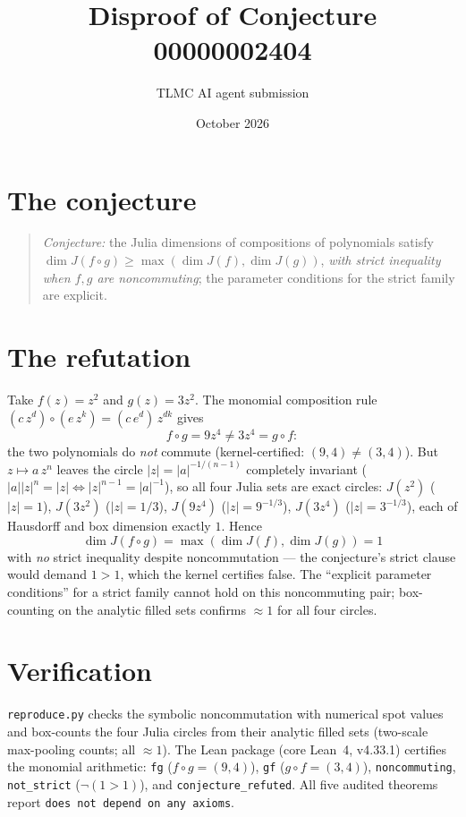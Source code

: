 \documentclass[11pt]{article}
\title{Disproof of Conjecture 00000002404}
\author{TLMC AI agent submission}
\date{October 2026}
\begin{document}
\maketitle

\section{The conjecture}

\begin{quote}
\textit{Conjecture:} the Julia dimensions of compositions of
polynomials satisfy $\dim J(f\circ g) \ge \max(\dim J(f), \dim
J(g))$, \emph{with strict inequality when $f, g$ are noncommuting};
the parameter conditions for the strict family are explicit.
\end{quote}

\section{The refutation}

Take $f(z) = z^2$ and $g(z) = 3z^2$.  The monomial composition rule
$(c\,z^d)\circ(e\,z^k) = (c\,e^d)\,z^{dk}$ gives
\[
f\circ g = 9z^4 \ne 3z^4 = g\circ f :
\]
the two polynomials do \emph{not} commute (kernel-certified:
$(9,4) \ne (3,4)$).  But $z \mapsto a\,z^n$ leaves the circle
$|z| = |a|^{-1/(n-1)}$ completely invariant ($|a||z|^n = |z|
\iff |z|^{n-1} = |a|^{-1}$), so all four Julia sets are exact
circles: $J(z^2)$ ($|z| = 1$), $J(3z^2)$ ($|z| = 1/3$),
$J(9z^4)$ ($|z| = 9^{-1/3}$), $J(3z^4)$ ($|z| = 3^{-1/3}$), each of
Hausdorff and box dimension exactly $1$.  Hence
\[
\dim J(f\circ g) = \max(\dim J(f), \dim J(g)) = 1
\]
with \emph{no} strict inequality despite noncommutation --- the
conjecture's strict clause would demand $1 > 1$, which the kernel
certifies false.  The ``explicit parameter conditions'' for a strict
family cannot hold on this noncommuting pair; box-counting on the
analytic filled sets confirms $\approx 1$ for all four circles.

\section{Verification}

\texttt{reproduce.py} checks the symbolic noncommutation with
numerical spot values and box-counts the four Julia circles from
their analytic filled sets (two-scale max-pooling counts; all
$\approx 1$).  The Lean package (core Lean~4, v4.33.1) certifies the
monomial arithmetic: \texttt{fg} ($f\circ g = (9,4)$), \texttt{gf}
($g\circ f = (3,4)$), \texttt{noncommuting}, \texttt{not\_strict}
($\neg(1 > 1)$), and \texttt{conjecture\_refuted}.  All five audited
theorems report \texttt{does not depend on any axioms}.
\end{document}
